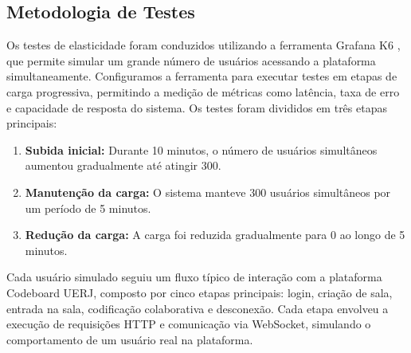 \subsection{Metodologia de Testes}

Os testes de elasticidade foram conduzidos utilizando a ferramenta Grafana K6 \cite{grafana-k6}, que permite simular um grande número de usuários acessando a plataforma simultaneamente. Configuramos a ferramenta para executar testes em etapas de carga progressiva, permitindo a medição de métricas como latência, taxa de erro e capacidade de resposta do sistema. Os testes foram divididos em três etapas principais:

\begin{enumerate}
    \item \textbf{Subida inicial:} Durante 10 minutos, o número de usuários simultâneos aumentou gradualmente até atingir 300.
    \item \textbf{Manutenção da carga:} O sistema manteve 300 usuários simultâneos por um período de 5 minutos.
    \item \textbf{Redução da carga:} A carga foi reduzida gradualmente para 0 ao longo de 5 minutos.
\end{enumerate}

Cada usuário simulado seguiu um fluxo típico de interação com a plataforma Codeboard UERJ, composto por cinco etapas principais: login, criação de sala, entrada na sala, codificação colaborativa e desconexão. Cada etapa envolveu a execução de requisições HTTP e comunicação via WebSocket, simulando o comportamento de um usuário real na plataforma.


